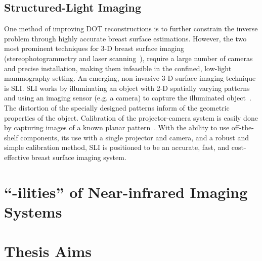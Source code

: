 \subsection{Structured-Light Imaging}
One method of improving \ac{DOT} reconstructions is to further constrain the inverse problem through highly accurate breast surface estimations. However, the two most prominent techniques for 3-D breast surface imaging (stereophotogrammetry and laser scanning~\cite{Yang2015}), require a large number of cameras and precise installation, making them infeasible in the confined, low-light mammography setting. An emerging, non-invasive 3-D surface imaging technique is \ac{SLI}. \ac{SLI} works by illuminating an object with 2-D spatially varying patterns and using an imaging sensor (e.g. a camera) to capture the illuminated object~\cite{Geng2011}. The distortion of the specially designed patterns inform of the geometric properties of the object. Calibration of the projector-camera system is easily done by capturing images of a known planar pattern~\cite{Moreno2012a}. With the ability to use off-the-shelf components, its use with a single projector and camera, and a robust and simple calibration method, SLI is positioned to be an accurate, fast, and cost-effective breast surface imaging system.



\section{``-ilities'' of Near-infrared Imaging Systems}
\label{chap:background:ilities}



\section{Thesis Aims}
\label{chap:background:aims}


